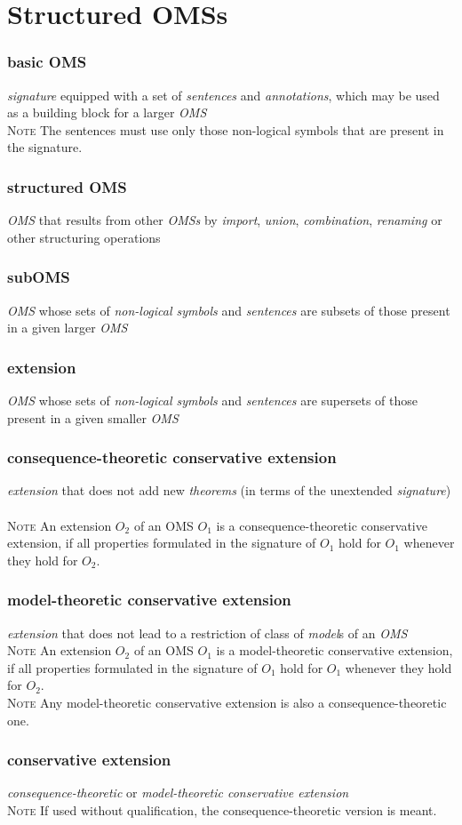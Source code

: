 \documentclass[10pt,%
\ifpretendfinal
final%
\else
draft%
\fi,
]{scrreprt}
\newcommand*{\termref}[1]{\textit{#1}}
\newcommand{\sclause}[1]{\section{#1}}
\newcommand{\termdefinition}[2]{\subsubsection*{\normalsize #1}#2}
\newenvironment{definitions}[0]{\medskip }{}
\newenvironment{note}[0]{\ \\ \textsc{Note} \quad}{}
\begin{document}
\sclause{Structured OMSs}
\begin{definitions}
\termdefinition{basic OMS}{\termref{signature} equipped with a set of \termref{sentences} and \termref{annotations}, which may be used as a building block for a larger \termref{OMS}}
  \begin{note}
    The sentences must use only those non-logical symbols that are present in the signature.
  \end{note}


\termdefinition{structured OMS}
{\termref{OMS} that results from other \termref{OMSs} by \termref{import}, \termref{union}, \termref{combination}, \termref{renaming} or other structuring operations}

  \termdefinition{subOMS}{\termref{OMS} whose sets of \termref{non-logical symbols} and \termref{sentences} are subsets of those present in a given larger \termref{OMS}}

  \termdefinition{extension}{\termref{OMS} whose sets of \termref{non-logical symbols} and \termref{sentences} are supersets of those present in a given smaller \termref{OMS}}

  \termdefinition{consequence-theoretic conservative extension}{\termref{extension} that does
   not add new \termref{theorems} (in terms of the unextended \termref{signature})}
  \begin{note}
    An extension $O_2$ of an OMS $O_1$ is a consequence-theoretic conservative extension, if all properties formulated in the signature of $O_1$ hold for $O_1$ whenever they hold for $O_2$.
  \end{note}

  \termdefinition{model-theoretic conservative extension}{\termref{extension}
   that does not lead to a restriction of class of \termref{model}s of an \termref{OMS}}
  \begin{note}
    An extension $O_2$ of an OMS $O_1$ is a model-theoretic conservative extension, if all properties formulated in the signature of $O_1$ hold for $O_1$ whenever they hold for $O_2$.
  \end{note}
  \begin{note}
   Any model-theoretic conservative extension is also a consequence-theoretic one.
  \end{note}

  \termdefinition{conservative extension}{\termref{consequence-theoretic} or \termref{model-theoretic conservative extension}}
  \begin{note}
   If used without qualification, the consequence-theoretic version is meant.
  \end{note}


\end{definitions}
\end{document}
